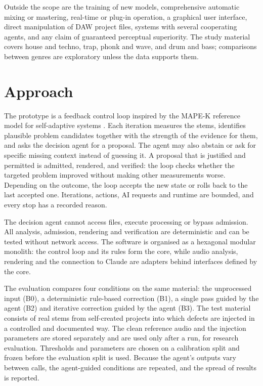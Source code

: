 Outside the scope are the training of new models, comprehensive automatic mixing or mastering, real-time or plug-in operation, a graphical user interface, direct manipulation of \ac{DAW} project files, systems with several cooperating agents, and any claim of guaranteed perceptual superiority. The study material covers house and techno, trap, phonk and wave, and drum and bass; comparisons between genres are exploratory unless the data supports them.

\section{Approach}
\label{sec:intro-approach}

The prototype is a feedback control loop inspired by the \ac{MAPE-K} reference model for self-adaptive systems \cite{Kephart2003}. Each iteration measures the stems, identifies plausible problem candidates together with the strength of the evidence for them, and asks the decision agent for a proposal. The agent may also abstain or ask for specific missing context instead of guessing it. A proposal that is justified and permitted is admitted, rendered, and verified: the loop checks whether the targeted problem improved without making other measurements worse. Depending on the outcome, the loop accepts the new state or rolls back to the last accepted one. Iterations, actions, \ac{AI} requests and runtime are bounded, and every stop has a recorded reason.

The decision agent cannot access files, execute processing or bypass admission. All analysis, admission, rendering and verification are deterministic and can be tested without network access. The software is organised as a hexagonal modular monolith: the control loop and its rules form the core, while audio analysis, rendering and the connection to Claude are adapters behind interfaces defined by the core.

The evaluation compares four conditions on the same material: the unprocessed input (B0), a deterministic rule-based correction (B1), a single pass guided by the agent (B2) and iterative correction guided by the agent (B3). The test material consists of real stems from self-created projects into which defects are injected in a controlled and documented way. The clean reference audio and the injection parameters are stored separately and are used only after a run, for research evaluation. Thresholds and parameters are chosen on a calibration split and frozen before the evaluation split is used. Because the agent's outputs vary between calls, the agent-guided conditions are repeated, and the spread of results is reported.

